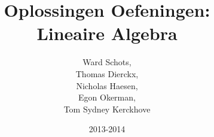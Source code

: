 \documentclass[a4paper]{article}
\title{Oplossingen Oefeningen:\\Lineaire Algebra}
\author{
Ward Schots,\\
Thomas Dierckx,\\
Nicholas Haesen,\\
Egon Okerman,\\
Tom Sydney Kerckhove}
\date{2013-2014}
\begin{document}
\begin{titlepage}
\maketitle
\end{titlepage}
\tableofcontents
\pagebreak














\end{document}
